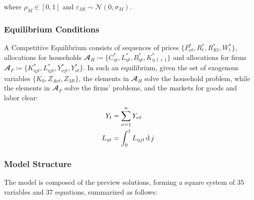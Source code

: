 \documentclass[
thesis.tex
]{subfiles}
\begin{document}
where $\rho_M \in [0,1]$ and $\varepsilon_{Mt} \sim \mathscr{N}(0,\sigma_M)$.


\subsubsection{Equilibrium Conditions}


A Competitive Equilibrium consists of sequences of prices $\{P_{\nu t}^\ast, R_t^\ast, R_{Kt}^\ast, W_t^\ast\}$, allocations for households $\mathbfscr{A}_H \coloneq \{C_{\eta t}^\ast, L_{\eta t}^\ast, B_{\eta t}^\ast, K_{\eta, t+1}^\ast\}$ and allocations  for firms $\mathbfscr{A}_F \coloneq \{K_{\eta jt}^\ast, L_{\eta jt}^\ast, Y_{\nu jt}^\ast, Y_{\nu t}^\ast\}$. In such an equilibrium, given the set of exogenous variables $\{K_0, Z_{A\nu t}, Z_{Mt}\}$, the elements in $\mathbfscr{A}_H$ solve the household problem, while the elements in $\mathbfscr{A}_F$ solve the firms' problems, and the markets for goods and labor clear:
\begin{align}
	Y_t &= \sum_{\nu=1}^{n} Y_{\nu t} \label{eq:reg-market-clearing-condition} \\
	L_{\eta t} &= \int_{0}^{1} L_{\eta jt} \operatorname{d} j \label{eq:reg-market-clearing-condition-2}
\end{align}



\subsubsection{Model Structure}

The model is composed of the preview solutions, forming a square system of 35 variables and 37 equations, summarized as follows:
\end{document}
